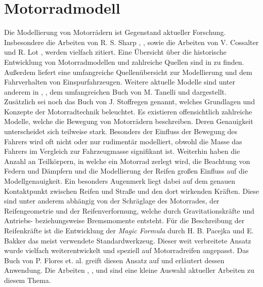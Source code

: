 \chapter{Motorradmodell}\label{ch:modell}
Die Modellierung von Motorr\"adern ist Gegenstand aktueller Forschung. Insbesondere die Arbeiten von R. S. Sharp \cite{Sharp1971}, \cite{SHARP1985}, \cite{Sharp2001} sowie die Arbeiten von V. Cossalter und R. Lot \cite{Cossalter2002}, \cite{Cossalter2010} werden vielfach zitiert. Eine \"Ubersicht \"uber die historische Entwicklung von Motorradmodellen und zahlreiche Quellen sind in \cite{Limebeer2006} zu finden. Au\ss{}erdem liefert \cite{Schwab2013} eine umfangreiche Quellen\"ubersicht zur Modellierung und dem Fahrverhalten von Einspurfahrzeugen. Weitere aktuelle Modelle sind unter anderem in \cite{Kanoh2007}, \cite{Nehaoua2013}, dem umfangreichen Buch von M. Tanelli \cite{MaraTanelli2014a} und \cite{Leonelli2015} dargestellt. Zus\"atzlich sei noch das Buch von J. Stoffregen \cite{Stoffregen2012} genannt, welches Grundlagen und Konzepte der Motorradtechnik beleuchtet.  \hfill \newline
Es existieren offensichtlich zahlreiche Modelle, welche die Bewegung von Motorr\"adern beschreiben. Deren Genauigkeit unterscheidet sich teilweise stark. Besonders der Einfluss der Bewegung des Fahrers wird oft nicht oder nur rudiment\"ar modelliert, obwohl die Masse das Fahrers im Vergleich zur Fahrzeugmasse signifikant ist. Weiterhin haben die Anzahl an Teilk\"orpern, in welche ein Motorrad zerlegt wird, die Beachtung von Federn und D\"ampfern und die Modellierung der Reifen gro\ss{}en Einfluss auf die Modellgenauigkeit. Ein besonders Augenmerk liegt dabei auf dem genauen Kontaktpunkt zwischen Reifen und Stra\ss{}e und den dort wirkenden Kr\"aften. Diese sind unter anderem abh\"angig von der Schr\"aglage des Motorrades, der Reifengeometrie und der Reifenverformung, welche durch Gravitationskr\"afte und Antriebs- beziehungsweise Bremsmomente entsteht. F\"ur die Beschreibung der Reifenkr\"afte ist die Entwicklung der \textit{Magic Formula} durch H. B. Pacejka und E. Bakker \cite{Pacejka1992} das meist verwendete Standardwerkzeug. Dieser weit verbreitete Ansatz wurde vielfach weiterentwickelt und speziell auf Motorradreifen angepasst. Das Buch von P. Flores et. al. \cite{Gent2006} greift diesen Ansatz auf und erl\"autert dessen Anwendung.  Die Arbeiten \cite{Besselink2010}, \cite{Pacejka2012}, \cite{Redrouthu2014} und \cite{Lot2004} sind eine kleine Auswahl aktueller Arbeiten zu diesem Thema. \hfill \newline

